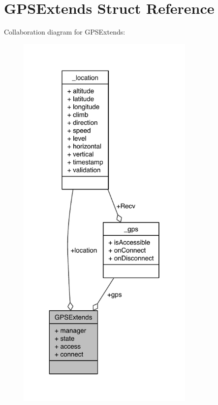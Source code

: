 \hypertarget{structGPSExtends}{\section{G\-P\-S\-Extends Struct Reference}
\label{structGPSExtends}
}


Collaboration diagram for G\-P\-S\-Extends\-:\nopagebreak
\begin{figure}[H]
\begin{center}
\leavevmode
\includegraphics[width=246pt]{df/dfb/structGPSExtends__coll__graph}
\end{center}
\end{figure}
